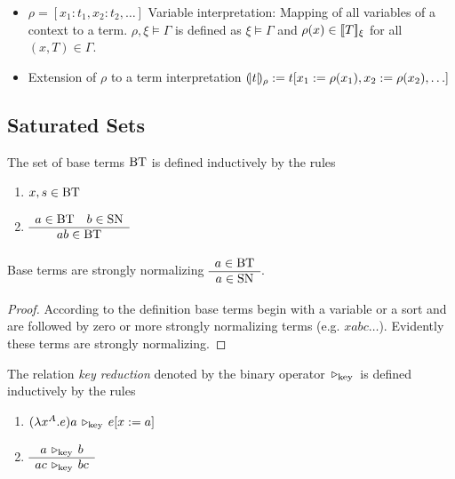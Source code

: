 \begin{itemize}
\item $\rho = [x_1: t_1, x_2 : t_2, \ldots]$ Variable interpretation: Mapping
  of all variables of a context to a term. $\rho,\xi \vDash \Gamma$ is defined
  as $\xi \vDash \Gamma$ and $\rho(x) \in [\![T]\!]_{\xi}$ for all
  $(x,T) \in \Gamma$.


\item Extension of $\rho$ to a term interpretation
  $(\!|t|\!)_{\rho} := t[x_1:= \rho(x_1), x_2:= \rho(x_2), \ldots]$
\end{itemize}







\subsection{Saturated Sets}

\begin{definition} %
  The set of base terms $\text{BT}$ is defined inductively by the rules
  \begin{enumerate}

  \item $x,s \in \text{BT}$

  \item $\begin{array}{c} a \in \text{BT} \quad b \in \text{SN} \\ \hline a b \in \text{BT}\end{array}$
  \end{enumerate}
\end{definition}


\begin{lemma}
  \label{BTSN}
  Base terms are strongly normalizing $\begin{array}{c} a \in \text{BT} \\ \hline a \in \text{SN}\end{array}$.
  \begin{proof}
    According to the definition base terms begin with a variable or a sort and
    are followed by zero or more strongly normalizing terms (e.g. $x a b c
    \ldots$). Evidently these terms are strongly normalizing.
  \end{proof}
\end{lemma}





\begin{definition} %
  The relation \emph{key reduction} denoted by the binary operator
  $\,\triangleright_{\text{key}}\,$ is defined inductively by the rules
  \begin{enumerate}

  \item $(\lambda x^A.e) a \,\triangleright_{\text{key}}\, e[x:=a]$

  \item $\begin{array}{c} a \,\triangleright_{\text{key}}\, b \\ \hline a c \,\triangleright_{\text{key}}\, b c\end{array}$
  \end{enumerate}
\end{definition}

